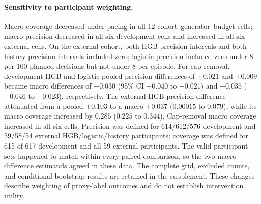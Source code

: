 \paragraph{Sensitivity to participant weighting.}
Macro coverage decreased under pacing in all 12 cohort--generator--budget cells; macro precision decreased in all six development cells and increased in all six external cells. On the external cohort, both HGB precision intervals and both history precision intervals included zero; logistic precision included zero under 8 per 100 planned decisions but not under 8 per episode. For cap removal, development HGB and logistic pooled precision differences of $+0.021$ and $+0.009$ became macro differences of $-0.030$ (95\% CI $-0.040$ to $-0.021$) and $-0.035$ ($-0.046$ to $-0.023$), respectively. The external HGB precision difference attenuated from a pooled $+0.103$ to a macro $+0.037$ ($0.00015$ to $0.079$), while its macro coverage increased by $0.285$ ($0.225$ to $0.344$). Cap-removal macro coverage increased in all six cells. Precision was defined for 614/612/576 development and 59/58/54 external HGB/logistic/history participants; coverage was defined for 615 of 617 development and all 59 external participants. The valid-participant sets happened to match within every paired comparison, so the two macro-difference estimands agreed in these data. The complete grid, excluded counts, and conditional bootstrap results are retained in the supplement. These changes describe weighting of proxy-label outcomes and do not establish intervention utility.
